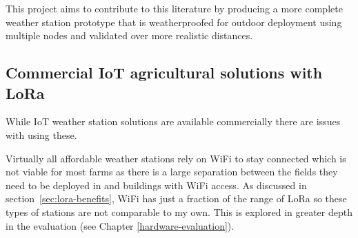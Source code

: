 This project aims to contribute to this literature by producing a more complete
weather station prototype that is weatherproofed for outdoor deployment using
multiple nodes and validated over more realistic distances.


\subsection{Commercial IoT agricultural solutions with LoRa}

While IoT weather station solutions are available commercially there are issues
with using these. 

Virtually all affordable weather stations rely on WiFi to stay connected which
is not viable for most farms as there is a large separation between the fields
they need to be deployed in and buildings with WiFi access. As discussed in
section~\ref{sec:lora-benefits}, WiFi has just a fraction of the range of LoRa
so these types of stations are not comparable to my own. This is explored in
greater depth in the evaluation (see Chapter \ref{hardware-evaluation}).
